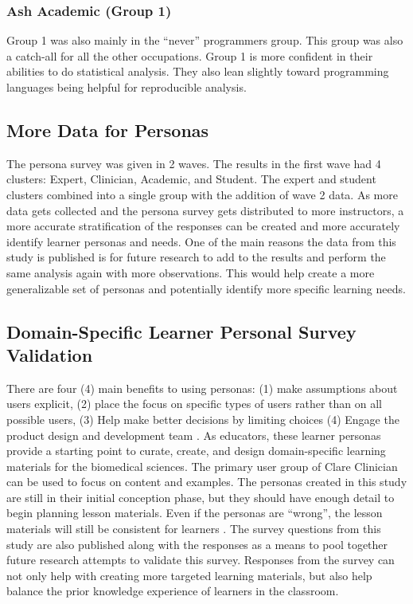 \documentclass[020-persona\_validation.tex]{subfiles}
\begin{document}
        \subsubsection{Ash Academic (Group 1)}

            Group 1 was also mainly in the ``never'' programmers group.
            This group was also a catch-all for all the other occupations.
            Group 1 is more confident in their abilities to do statistical analysis.
            They also lean slightly toward programming languages being helpful for reproducible analysis.

    \subsection{More Data for Personas}

        The persona survey was given in 2 waves.
        The results in the first wave had 4 clusters: Expert, Clinician, Academic, and Student.
        The expert and student clusters combined into a single group with the addition of wave 2 data.
        As more data gets collected and the persona survey gets distributed to more instructors,
        a more accurate stratification of the responses can be created and more accurately identify learner personas and needs.
        One of the main reasons the data from this study is published is for future research to add to the results
        and perform the same analysis again with more observations.
        This would help create a more generalizable set of personas and potentially identify more specific learning needs.

    \subsection{Domain-Specific Learner Personal Survey Validation}

        There are four (4) main benefits to using personas:
        (1) make assumptions about users explicit,
        (2) place the focus on specific types of users rather than on all possible users,
        (3) Help make better decisions by limiting choices
        (4) Engage the product design and development team
        \cite{pruittPersonaLifecycleKeeping2006, schwartzParadoxChoiceWhy2016}.
        As educators, these learner personas provide a starting point to curate, create, and design
        domain-specific learning materials for the biomedical sciences.
        The primary user group of Clare Clinician can be used to focus on content and examples.
        The personas created in this study are still in their initial conception phase,
        but they should have enough detail to begin planning lesson materials.
        Even if the personas are ``wrong'',
        the lesson materials will still be consistent for learners
        \cite{pruittPersonaLifecycleKeeping2006}.
        The survey questions from this study are also published along with the responses as a means
        to pool together future research attempts to validate this survey.
        Responses from the survey can not only help with creating more targeted learning materials,
        but also help balance the prior knowledge experience of learners in the classroom.
\end{document}
